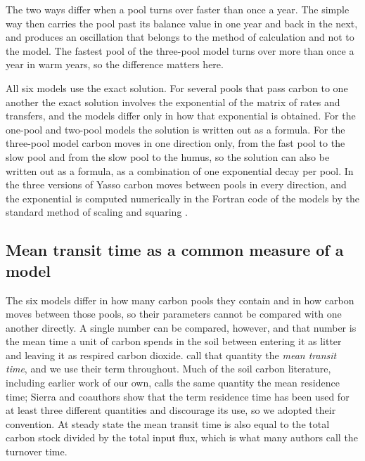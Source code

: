 \documentclass[11pt]{article}
\begin{document}
The two ways differ when a pool turns over faster than once a year. The simple way then
carries the pool past its balance value in one year and back in the next, and produces
an oscillation that belongs to the method of calculation and not to the model. The
fastest pool of the three-pool model turns over more than once a year in warm years,
so the difference matters here.

All six models use the exact solution. For several pools that pass carbon to one
another the exact solution involves the exponential of the matrix of rates and
transfers, and the models differ only in how that exponential is obtained. For the
one-pool and two-pool models the solution is written out as a formula. For the
three-pool model carbon moves in one direction only, from the fast pool to the slow
pool and from the slow pool to the humus, so the solution can also be written out as a
formula, as a combination of one exponential decay per pool. In the three versions of
Yasso carbon moves between pools in every direction, and the exponential is computed
numerically in the Fortran code of the models by the standard method of scaling and
squaring \citep{MolerVanLoan2003}.

\subsection{Mean transit time as a common measure of a model}\label{sec:mtt}

The six models differ in how many carbon pools they contain and in how carbon moves
between those pools, so their parameters cannot be compared with one another
directly. A single number can be compared, however, and that number is the mean time
a unit of carbon spends in the soil between entering it as litter and leaving it as
respired carbon dioxide. \citet{Sierra2017} call that quantity the \emph{mean transit
time}, and we use their term throughout. Much of the soil carbon literature, including
earlier work of our own, calls the same quantity the mean residence time; Sierra and
coauthors show that the term residence time has been used for at least three different
quantities and discourage its use, so we adopted their convention. At steady state the mean transit time is also equal to the total
carbon stock divided by the total input flux, which is what many authors call the
turnover time.
\end{document}
